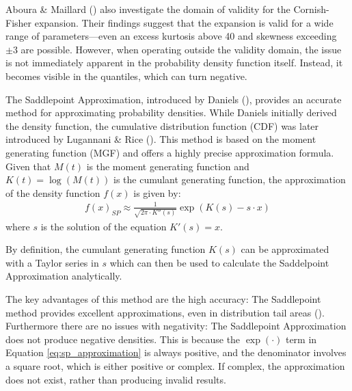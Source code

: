 Aboura \& Maillard (\citeyear{abouraOptionPricingSkewness2016}) also investigate the domain of validity for the Cornish-Fisher expansion. Their findings suggest that the expansion is valid for a wide range of parameters—even an excess kurtosis above 40 and skewness exceeding $\pm 3$ are possible. However, when operating outside the validity domain, the issue is not immediately apparent in the probability density function itself. Instead, it becomes visible in the quantiles, which can turn negative.

The Saddlepoint Approximation, introduced by Daniels (\citeyear{danielsSaddlepointApproximationsStatistics1954}), provides an accurate method for approximating probability densities. While Daniels initially derived the density function, the cumulative distribution function (CDF) was later introduced by Lugannani \& Rice (\citeyear{lugannaniSaddlePointApproximation1980}). This method is based on the moment generating function (MGF) and offers a highly precise approximation formula. Given that $M(t)$ is the moment generating function and $K(t) = \log(M(t))$ is the cumulant generating function, the approximation of the density function $f(x)$ is given by:
\begin{align}
    \label{eq:sp_approximation}
    f(x)_{SP} \approx \frac{1}{\sqrt{2\pi\cdot K''(s)}}\exp(K(s) - s\cdot x)
\end{align}
where $s$ is the solution of the equation $K'(s) = x$.

By definition, the cumulant generating function $K(s)$ can be approximated with a Taylor series in $s$ which can then be used to calculate the Saddelpoint Approximation analytically.

The key advantages of this method are the high accuracy: The Saddlepoint method provides excellent approximations, even in distribution tail areas (\cite{duSystemReliabilityAnalysis2010,reidSaddlepointMethodsStatistical1988}). Furthermore there are no issues with negativity: The Saddlepoint Approximation does not produce negative densities. This is because the $\exp(\cdot)$ term in Equation \eqref{eq:sp_approximation} is always positive, and the denominator involves a square root, which is either positive or complex. If complex, the approximation does not exist, rather than producing invalid results.